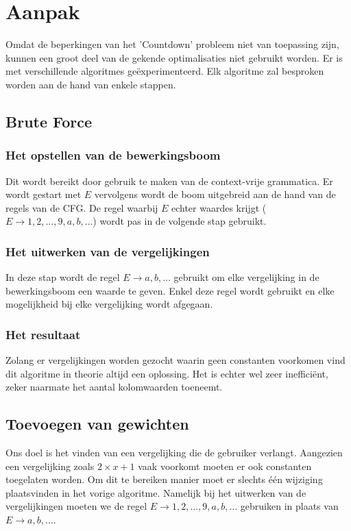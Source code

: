 \documentclass[Main.tex]{subfiles}
\begin{document}
\section{Aanpak}
Omdat de beperkingen van het 'Countdown' probleem niet van toepassing zijn, kunnen een groot deel van de gekende optimalisaties niet gebruikt worden. Er is met verschillende algoritmes geëxperimenteerd. Elk algoritme zal besproken worden aan de hand van enkele stappen.
\subsection{Brute Force}
\subsubsection*{Het opstellen van de bewerkingsboom}
Dit wordt bereikt door gebruik te maken van de context-vrije grammatica. Er wordt gestart met $E$ vervolgens wordt de boom uitgebreid aan de hand van de regels van de CFG. De regel waarbij $E$ echter waardes krijgt ($E \rightarrow 1,2,\dotsc,9,a,b,\dotsc$) wordt pas in de volgende stap gebruikt. %
\subsubsection*{Het uitwerken van de vergelijkingen}
In deze stap wordt de regel $E \rightarrow a,b,\dotsc$ gebruikt om elke vergelijking in de bewerkingsboom een waarde te geven. Enkel deze regel wordt gebruikt en elke mogelijkheid bij elke vergelijking wordt afgegaan. %
\subsubsection*{Het resultaat}
Zolang er vergelijkingen worden gezocht waarin geen constanten voorkomen vind dit algoritme in theorie altijd een oplossing. Het is echter wel zeer inefficiënt, zeker naarmate het aantal kolomwaarden  %
toeneemt.
\subsection{Toevoegen van gewichten}
Ons doel %
is het vinden van een vergelijking die de gebruiker verlangt. Aangezien een vergelijking zoals $2 \times x+1$ vaak voorkomt moeten er ook constanten toegelaten worden. Om dit te bereiken manier moet er slechts één wijziging plaatsvinden in het vorige algoritme. Namelijk bij het uitwerken van de vergelijkingen moeten we de regel $E \rightarrow 1,2,\dotsc,9,a,b,\dotsc$ gebruiken in plaats van $E \rightarrow a,b,\dotsc$.
\end{document}
